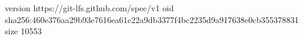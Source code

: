 version https://git-lfs.github.com/spec/v1
oid sha256:460e376aa29b93e7616ea61c22a9db3377f4bc2235d9a917638e0cb355378831
size 10553
